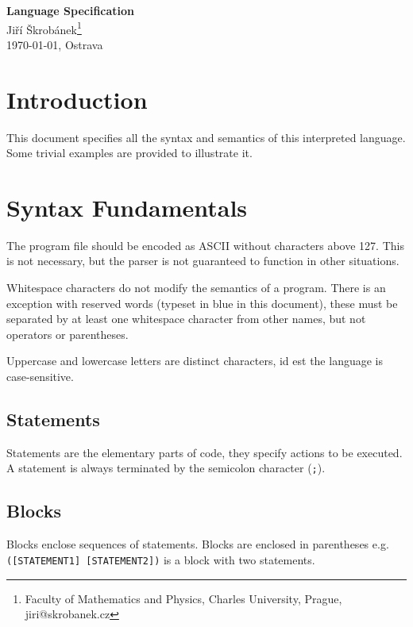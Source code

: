 \documentclass[a4paper,11pt,openany]{article}
\begin{document}
\begin{center}
{\huge \textbf{Language Specification}}\\
\vspace{10mm} {\large Jiří Škrobánek\footnote[1]{Faculty of Mathematics and Physics, Charles University, Prague, {\ttfamily jiri@skrobanek.cz}}}\\
\vspace{10mm}\today, Ostrava
\end{center}
	
\section*{Introduction}
	
This document specifies all the syntax and semantics of this interpreted language. Some trivial examples are provided to illustrate it.
	
\tableofcontents

\section{Syntax Fundamentals}

The program file should be encoded as ASCII without characters above 127. This is not necessary, but the parser is not guaranteed to function in other situations.

Whitespace characters do not modify the semantics of a program. There is an exception with reserved words (typeset in blue in this document), these must be separated by at least one whitespace character from other names, but not operators or parentheses.

Uppercase and lowercase letters are distinct characters, id est the language is case-sensitive.

\subsection{Statements}

Statements are the elementary parts of code, they specify actions to be executed. A statement is always terminated by the semicolon character (\texttt{;}).

\subsection{Blocks}

Blocks enclose sequences of statements. Blocks are enclosed in parentheses e.g.\\ \texttt{([STATEMENT1] [STATEMENT2])} is a block with two statements.
\end{document}
